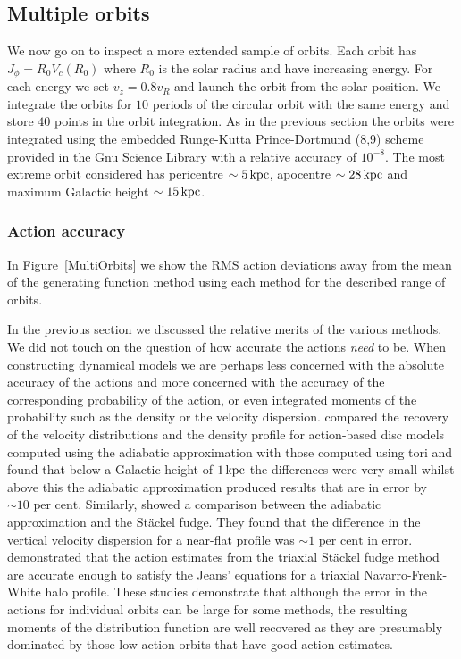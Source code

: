 \documentclass[useAMS,usenatbib,fleqn,a4paper]{mn2e}
\def\kpc{\,{\rm kpc}}
\def\percent{\text{ per cent}}
\def\percent{\text{ per cent}}
\begin{document}
\subsection{Multiple orbits}\label{ManyOrbs}
We now go on to inspect a more extended sample of orbits. Each orbit has $J_\phi=R_0V_c(R_0)$ where $R_0$ is the solar radius and have increasing energy. For each energy we set $v_z=0.8v_R$ and launch the orbit from the solar position. We integrate the orbits for $10$ periods of the circular orbit with the same energy and store $40$ points in the orbit integration. As in the previous section the orbits were integrated using the embedded Runge-Kutta Prince-Dortmund (8,9) scheme provided in the Gnu Science Library \citep{GSL} with a relative accuracy of $10^{-8}$. The most extreme orbit considered has pericentre $\sim5\kpc$, apocentre $\sim28\kpc$ and maximum Galactic height $\sim15\kpc$.

\subsubsection{Action accuracy}
In Figure~\ref{MultiOrbits} we show the RMS action deviations away from the mean of the generating function method using each method for the described range of orbits.

In the previous section we discussed the relative merits of the various methods. We did not touch on the question of how accurate the actions \emph{need} to be. When constructing dynamical models we are perhaps less concerned with the absolute accuracy of the actions and more concerned with the accuracy of the corresponding probability of the action, or even integrated moments of the probability such as the density or the velocity dispersion. \cite{BinneyMcMillan2011} compared the recovery of the velocity distributions and the density profile for action-based disc models computed using the adiabatic approximation with those computed using tori and found that below a Galactic height of $1\kpc$ the differences were very small whilst above this the adiabatic approximation produced results that are in error by $\sim10\percent$. Similarly, \cite{BovyRix2013} showed a comparison between the adiabatic approximation and the St\"ackel fudge. They found that the difference in the vertical velocity dispersion for a near-flat profile was $\sim1\percent$ in error. \cite{SandersBinney2014} demonstrated that the action estimates from the triaxial St\"ackel fudge method are accurate enough to satisfy the Jeans' equations for a triaxial Navarro-Frenk-White halo profile. These studies demonstrate that although the error in the actions for individual orbits can be large for some methods, the resulting moments of the distribution function are well recovered as they are presumably dominated by those low-action orbits that have good action estimates.
\end{document}
